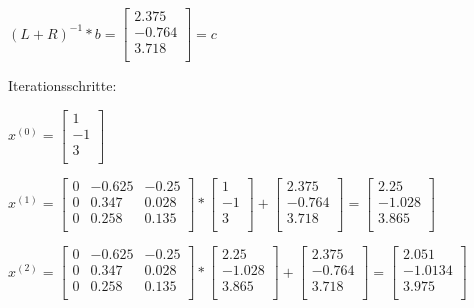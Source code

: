 \documentclass{article}
\begin{document}
\(
(L+R)^{-1} * b = 
\begin{bmatrix} 
2.375 \\
-0.764 \\
3.718 \\
\end{bmatrix}
=
c
\)

Iterationsschritte:

\(
x^{(0)} = 
\begin{bmatrix} 
1\\
-1\\
3\\
\end{bmatrix}
\)

\(
x^{(1)} = 
\begin{bmatrix} 
0 & -0.625 & -0.25 \\
0 & 0.347 & 0.028 \\
0 & 0.258 & 0.135 \\
\end{bmatrix}
*
\begin{bmatrix} 
1\\
-1\\
3\\
\end{bmatrix}
+
\begin{bmatrix} 
2.375 \\
-0.764 \\
3.718 \\
\end{bmatrix}
=
\begin{bmatrix} 
2.25\\
-1.028\\
3.865\\
\end{bmatrix}
\)

\(
x^{(2)} = 
\begin{bmatrix} 
0 & -0.625 & -0.25 \\
0 & 0.347 & 0.028 \\
0 & 0.258 & 0.135 \\
\end{bmatrix}
*
\begin{bmatrix} 
2.25\\
-1.028\\
3.865\\
\end{bmatrix}
+
\begin{bmatrix} 
2.375 \\
-0.764 \\
3.718 \\
\end{bmatrix}
=
\begin{bmatrix} 
2.051\\
-1.0134\\
3.975\\
\end{bmatrix}
\)
\end{document}
